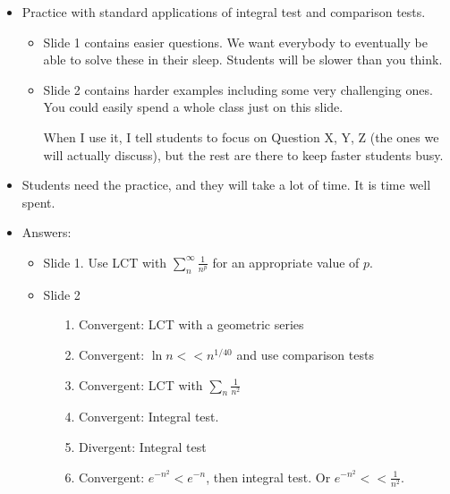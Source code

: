 \documentclass[11pt]{article}
\newcommand {\DS} [1] {${\displaystyle #1}$}
\newcommand{\nl}{\hfill \vspace{-1.1\baselineskip}} %
\begin{document}
\begin{comments}
\nl
	\begin{itemize}
		\item   Practice with standard applications of integral test and comparison tests.
			\begin{itemize}
				\item  Slide 1 contains easier questions.  We want everybody to eventually be able to solve these in their sleep.  Students will be slower than you think.
				\item  Slide 2 contains harder examples including some very challenging ones.  You could easily spend a whole class just on this slide.    

					When I use it, I tell students to focus on Question X, Y, Z (the ones we will actually discuss), but the rest are there to keep faster students busy.
			\end{itemize}
		\item Students need the practice, and they will take a lot of time.  It is time well spent.
		
		\item Answers:
			\begin{itemize}
				\item Slide 1.  Use LCT with \DS{\sum_{n}^{\infty} \frac{1}{n^p}} for an appropriate value of $p$.
					\begin{itemize}
  					\end{itemize}
				\item Slide 2
					\begin{itemize}
						\item[1.]  Convergent: LCT with a geometric series
						\item[2.]  Convergent:  \DS{\ln n << n^{1/40}} and use comparison tests
						\item[3.]  Convergent:  LCT with \DS{\sum_{n} \frac{1}{n^2}}
						\item[4.]  Convergent:  Integral test.
						\item[5.]  Divergent: Integral test
						\item[6.]  Convergent:  \DS{e^{-n^2} < e^{-n}}, then integral test.  Or \DS{e^{-n^2} << \frac{1}{n^2}}.
					\end{itemize}
			\end{itemize}
	\end{itemize}
\end{comments}
\end{document}
